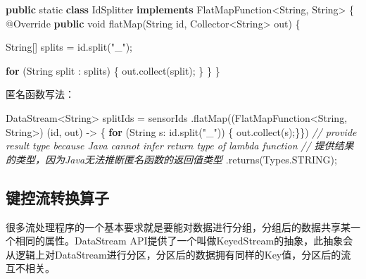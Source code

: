 \documentclass[cn,11pt,chinese]{elegantbook}
\newenvironment{Shaded}{}{}
\newcommand{\AttributeTok}[1]{\textcolor[rgb]{0.49,0.56,0.16}{#1}}
\newcommand{\BuiltInTok}[1]{#1}
\newcommand{\CommentTok}[1]{\textcolor[rgb]{0.38,0.63,0.69}{\textit{#1}}}
\newcommand{\DataTypeTok}[1]{\textcolor[rgb]{0.56,0.13,0.00}{#1}}
\newcommand{\FunctionTok}[1]{\textcolor[rgb]{0.02,0.16,0.49}{#1}}
\newcommand{\KeywordTok}[1]{\textcolor[rgb]{0.00,0.44,0.13}{\textbf{#1}}}
\newcommand{\NormalTok}[1]{#1}
\newcommand{\StringTok}[1]{\textcolor[rgb]{0.25,0.44,0.63}{#1}}
\begin{document}
\begin{Shaded}
\begin{Highlighting}[]
\KeywordTok{public} \DataTypeTok{static} \KeywordTok{class}\NormalTok{ IdSplitter }\KeywordTok{implements}\NormalTok{ FlatMapFunction\textless{}}\BuiltInTok{String}\NormalTok{, }\BuiltInTok{String}\NormalTok{\textgreater{} \{}
    \AttributeTok{@Override}
    \KeywordTok{public} \DataTypeTok{void} \FunctionTok{flatMap}\NormalTok{(}\BuiltInTok{String}\NormalTok{ id, Collector\textless{}}\BuiltInTok{String}\NormalTok{\textgreater{} out) \{}

        \BuiltInTok{String}\NormalTok{[] splits = id.}\FunctionTok{split}\NormalTok{(}\StringTok{"\_"}\NormalTok{);}

        \KeywordTok{for}\NormalTok{ (}\BuiltInTok{String}\NormalTok{ split : splits) \{}
\NormalTok{            out.}\FunctionTok{collect}\NormalTok{(split);}
\NormalTok{        \}}
\NormalTok{    \}}
\NormalTok{\}}
\end{Highlighting}
\end{Shaded}

匿名函数写法：

\begin{Shaded}
\begin{Highlighting}[]
\NormalTok{DataStream\textless{}}\BuiltInTok{String}\NormalTok{\textgreater{} splitIds = sensorIds}
\NormalTok{    .}\FunctionTok{flatMap}\NormalTok{((FlatMapFunction\textless{}}\BuiltInTok{String}\NormalTok{, }\BuiltInTok{String}\NormalTok{\textgreater{})}
\NormalTok{            (id, out) {-}\textgreater{} \{ }\KeywordTok{for}\NormalTok{ (}\BuiltInTok{String}\NormalTok{ s: id.}\FunctionTok{split}\NormalTok{(}\StringTok{"\_"}\NormalTok{)) \{ out.}\FunctionTok{collect}\NormalTok{(s);\}\})}
    \CommentTok{// provide result type because Java cannot infer return type of lambda function}
    \CommentTok{// 提供结果的类型，因为Java无法推断匿名函数的返回值类型}
\NormalTok{    .}\FunctionTok{returns}\NormalTok{(}\BuiltInTok{Types}\NormalTok{.}\FunctionTok{STRING}\NormalTok{);}
\end{Highlighting}
\end{Shaded}

\hypertarget{ux952eux63a7ux6d41ux8f6cux6362ux7b97ux5b50}{%
\subsection{键控流转换算子}\label{ux952eux63a7ux6d41ux8f6cux6362ux7b97ux5b50}}

很多流处理程序的一个基本要求就是要能对数据进行分组，分组后的数据共享某一个相同的属性。DataStream
API提供了一个叫做KeyedStream的抽象，此抽象会从逻辑上对DataStream进行分区，分区后的数据拥有同样的Key值，分区后的流互不相关。
\end{document}
